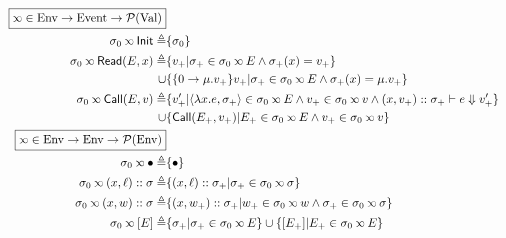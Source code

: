 \documentclass{article}
\begin{document}
\begin{figure}
  \begin{align*}
    \fbox{$\semlink\in\Ctx\rightarrow\Event\rightarrow\pset(\Value)$}                                                                                                                               \\
    \ctx_0\semlink\InitE\triangleq                         & \{\ctx_0\}                                                                                                                             \\
    \ctx_0\semlink\ReadE(\event,x)\triangleq               & \{v_+|\ctx_+\in\ctx_0\semlink\event\land\ctx_+(x)=v_+\}                                                                                \\
    \cup                                                   & \{\openloc{\mu.v_+}{v_+}|\ctx_+\in\ctx_0\semlink E\land\ctx_+(x)=\mu.v_+\}                                                             \\
    \ctx_0\semlink\CallE(\event,v)\triangleq               & \{v_+'|\langle\lambda x.e,\ctx_+\rangle\in\ctx_0\semlink E\land v_+\in\ctx_0\semlink v\land(x,v_+)\cons\ctx_+\vdash e\Downarrow v_+'\} \\
    \cup                                                   & \{\CallE(\event_+,v_+)|\event_+\in\ctx_0\semlink\event\land v_+\in\ctx_0\semlink v\}                                                   \\
    \fbox{$\semlink\in\Ctx\rightarrow\Ctx\rightarrow\pset(\Ctx)$}                                                                                                                                   \\
    \ctx_0\semlink\bullet\triangleq                        & \{\bullet\}                                                                                                                            \\
    \ctx_0\semlink(x,\ell)\cons\ctx\triangleq              & \{(x,\ell)\cons\ctx_+|\ctx_+\in\ctx_0\semlink\ctx\}                                                                                    \\
    \ctx_0\semlink(x,w)\cons\ctx\triangleq                 & \{(x,w_+)\cons\ctx_+|w_+\in\ctx_0\semlink w\land\ctx_+\in\ctx_0\semlink\ctx\}                                                          \\
    \ctx_0\semlink[E]\triangleq                            & \{\ctx_+|\ctx_+\in\ctx_0\semlink\event\}\cup\{[\event_+]|\event_+\in\ctx_0\semlink\event\}                                             \\

\end{align*}
\end{figure}
\end{document}
